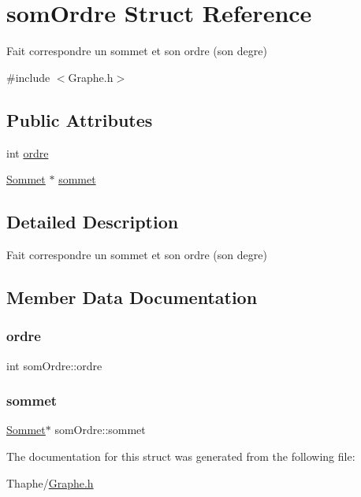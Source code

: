 \hypertarget{structsom_ordre}{}\section{som\+Ordre Struct Reference}
\label{structsom_ordre}


Fait correspondre un sommet et son ordre (son degre)  




{\ttfamily \#include $<$Graphe.\+h$>$}

\subsection*{Public Attributes}
\begin{DoxyCompactItemize}
\item 
int \mbox{\hyperlink{structsom_ordre_a187b33358f51c2bc358b19d63719c76e}{ordre}}
\item 
\mbox{\hyperlink{class_sommet}{Sommet}} $\ast$ \mbox{\hyperlink{structsom_ordre_a2a79c9dedec7b0dccf5665be5cdf434f}{sommet}}
\end{DoxyCompactItemize}


\subsection{Detailed Description}
Fait correspondre un sommet et son ordre (son degre) 

\subsection{Member Data Documentation}
\mbox{\label{structsom_ordre_a187b33358f51c2bc358b19d63719c76e}} 
\subsubsection{\texorpdfstring{ordre}{ordre}}
{\footnotesize\ttfamily int som\+Ordre\+::ordre}

\mbox{\label{structsom_ordre_a2a79c9dedec7b0dccf5665be5cdf434f}} 
\subsubsection{\texorpdfstring{sommet}{sommet}}
{\footnotesize\ttfamily \mbox{\hyperlink{class_sommet}{Sommet}}$\ast$ som\+Ordre\+::sommet}



The documentation for this struct was generated from the following file\+:\begin{DoxyCompactItemize}
\item 
Thaphe/\mbox{\hyperlink{_graphe_8h}{Graphe.\+h}}\end{DoxyCompactItemize}
